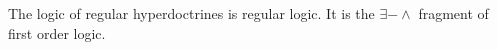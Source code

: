 \documentclass[12pt]{article}
\newtheorem{example}[theorem]{Example}
\newtheorem{remark}[theorem]{Remark}
\begin{document}
The logic of regular hyperdoctrines is regular logic. It is the $\exists-\land$ fragment
of first order logic.
    
    
\end{document}
